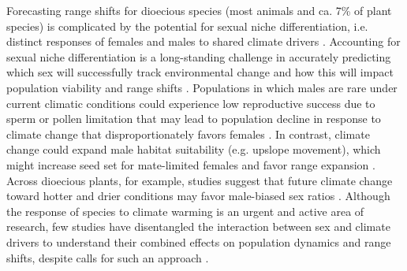 \documentclass[9pt,twocolumn,twoside,lineno]{pnas-new}
\begin{document}
Forecasting range shifts for dioecious species (most animals and ca. 7\% of plant species) is complicated by the potential for sexual niche differentiation, i.e. distinct responses of females and males to shared climate drivers \citep{Tognetti2012,pottier2021sexual,hultine2016climate,morrison2016causes}. 
Accounting for sexual niche differentiation is a long-standing challenge in accurately predicting which sex will successfully track environmental change and how this will impact population viability and range shifts \citep{jones1999sex,gissi2023exploring}. 
Populations in which males are rare under current climatic conditions could experience low reproductive success due to sperm or pollen limitation that may lead to population decline in response to climate change that disproportionately favors females \citep{eberhart2017sex}.
In contrast, climate change could expand male habitat suitability (e.g. upslope movement), which might increase seed set for mate-limited females and favor range expansion \citep{petry2016sex}. 
Across dioecious plants, for example, studies suggest that future climate change toward hotter and drier conditions may favor male-biased sex ratios \citep{field2013comparative,hultine2016climate}. 
Although the response of species to climate warming is an urgent and active area of research, few studies have disentangled the interaction between sex and climate drivers to understand their combined effects on population dynamics and range shifts, despite calls for such an approach \citep{hultine2016climate,gissi2023exploring}.
\end{document}
